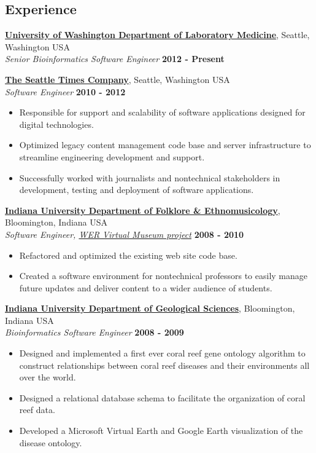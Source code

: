 \documentclass{res}
\begin{document}
\address{1136B 15th Ave\\Seattle, WA 98122} 
\address{\textit{T:} (630) 788-0468\\\textit{Email:} crosenth@gmail.com}
\begin{resume}

\section{Experience}

\href{http://depts.washington.edu/labweb/}{\textbf{University of Washington Department of Laboratory Medicine}},
Seattle, Washington USA\\
\textit{Senior Bioinformatics Software Engineer} \hfill \textbf{2012 - Present}

\href{http://www.seattletimes.com/}{\textbf{The Seattle Times Company}},
Seattle, Washington USA\\
\textit{Software Engineer} \hfill \textbf{2010 - 2012}
\begin{itemize} \itemsep -2pt
\item Responsible for support and scalability of software applications designed for digital technologies.
\item Optimized legacy content management code base and server infrastructure to streamline engineering development and support.
\item Successfully worked with journalists and nontechnical stakeholders in development, testing and deployment of software applications.
\end{itemize}

\href{http://www.indiana.edu/~folklore/}{\textbf{Indiana University Department of Folklore \& Ethnomusicology}}, Bloomington, Indiana USA\\
\textit{Software Engineer, \href{http://www.iub.edu/~wer/}{WER Virtual Museum project}} \hfill \textbf{2008 - 2010}
\begin{itemize} \itemsep -2pt
\item Refactored and optimized the existing web site code base.
\item Created a software environment for nontechnical professors to easily manage future updates and deliver content to a wider audience of students.
\end{itemize}

\href{http://geology.indiana.edu/}{\textbf{Indiana University Department of Geological Sciences}}, Bloomington, Indiana USA\\
\textit{Bioinformatics Software Engineer} \hfill \textbf{2008 - 2009}
\begin{itemize} \itemsep -2pt
\item Designed and implemented a first ever coral reef gene ontology algorithm to construct relationships between coral reef diseases and their environments all over the world.
\item Designed a relational database schema to facilitate the organization of coral reef data.
\item Developed a Microsoft Virtual Earth and Google Earth visualization of the disease ontology.
\end{itemize}


\end{resume}
\end{document}
